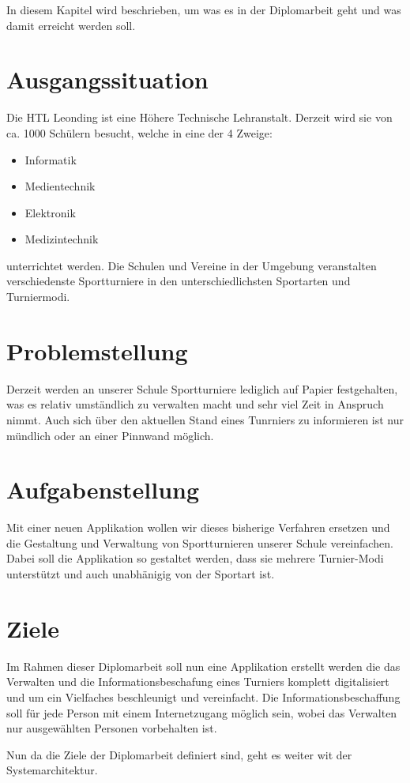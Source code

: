 In diesem Kapitel wird beschrieben, um was es in der Diplomarbeit geht und was damit erreicht werden soll.

\section{Ausgangssituation}
Die HTL Leonding ist eine Höhere Technische Lehranstalt. 
Derzeit wird sie von ca. 1000 Schülern besucht, welche in eine der 4 Zweige:
\begin{itemize}
\item Informatik
\item Medientechnik
\item Elektronik
\item Medizintechnik
\end{itemize}

unterrichtet werden. Die Schulen und Vereine in der Umgebung veranstalten 
verschiedenste Sportturniere in den unterschiedlichsten Sportarten und Turniermodi.

\section{Problemstellung}

 Derzeit werden an unserer Schule Sportturniere lediglich auf Papier festgehalten, 
 was es relativ umständlich zu verwalten macht und sehr viel Zeit in Anspruch nimmt. 
 Auch sich über den aktuellen Stand eines Tunrniers zu informieren ist nur mündlich oder an einer Pinnwand möglich.

\section{Aufgabenstellung}
Mit einer neuen Applikation wollen wir dieses bisherige Verfahren ersetzen und die Gestaltung 
und Verwaltung von Sportturnieren unserer Schule vereinfachen. Dabei soll die Applikation so gestaltet werden, 
dass sie mehrere Turnier-Modi unterstützt und auch unabhänigig von der Sportart ist.

\section{Ziele}
Im Rahmen dieser Diplomarbeit soll nun eine Applikation erstellt werden die das Verwalten und die 
Informationsbeschafung eines Turniers komplett digitalisiert und um ein Vielfaches beschleunigt und vereinfacht. 
Die Informationsbeschaffung soll für jede Person mit einem Internetzugang möglich sein, 
wobei das Verwalten nur ausgewählten Personen vorbehalten ist.

Nun da die Ziele der Diplomarbeit definiert sind, geht es weiter wit der Systemarchitektur.